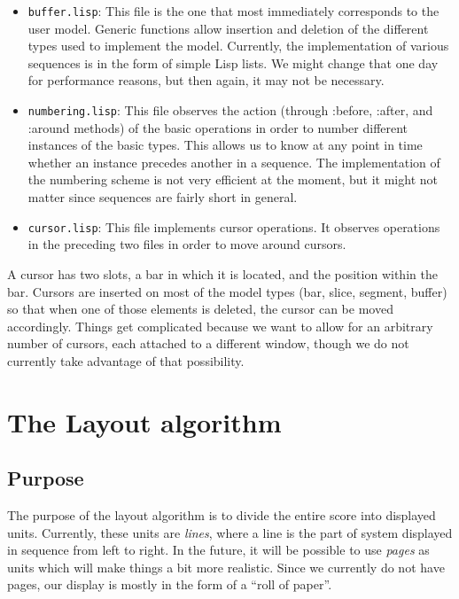 \documentclass[11pt]{book}
\def\inputtex#1{}
\begin{document}
\begin{itemize} 
\item \texttt{buffer.lisp}: This file is the one that most immediately
  corresponds to the user model.  Generic functions allow insertion
  and deletion of the different types used to implement the model.
  Currently, the implementation of various sequences is in the form of
  simple Lisp lists.  We might change that one day for performance
  reasons, but then again, it may not be necessary. 
\item \texttt{numbering.lisp}: This file observes the action (through
  :before, :after, and :around methods) of the basic operations in
  order to number different instances of the basic types.  This allows
  us to know at any point in time whether an instance precedes another
  in a sequence.  The implementation of the numbering scheme is not
  very efficient at the moment, but it might not matter since
  sequences are fairly short in general.
\item \texttt{cursor.lisp}: This file implements cursor operations.
  It observes operations in the preceding two files in order to move
  around cursors.  
\end{itemize}

A cursor has two slots, a bar in which it is located, and the position
within the bar.  Cursors are inserted on most of the model types (bar,
slice, segment, buffer) so that when one of those elements is deleted,
the cursor can be moved accordingly.  Things get complicated because
we want to allow for an arbitrary number of cursors, each attached to
a different window, though we do not currently take advantage of that
possibility.

\inputtex{buffer.tex}
\chapter{The Layout algorithm}

\section{Purpose}

The purpose of the layout algorithm is to divide the entire score into
displayed units.  Currently, these units are \emph{lines}, where a
line is the part of system displayed in sequence from left to right.
In the future, it will be possible to use \emph{pages} as units which
will make things a bit more realistic.  Since we currently do not have
pages, our display is mostly in the form of a ``roll of paper''.
\end{document}
